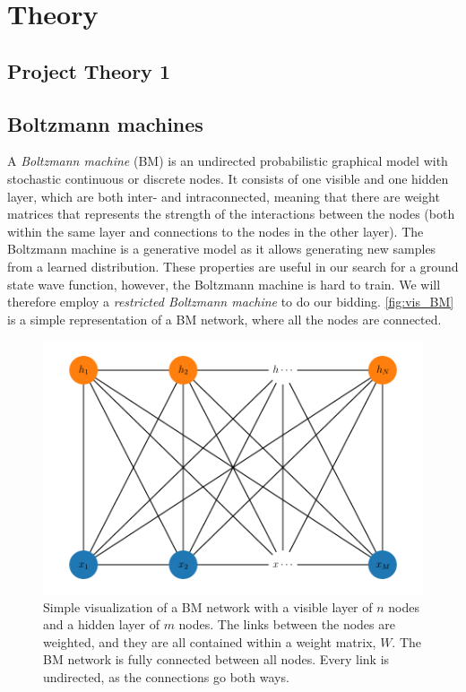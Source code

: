 \section{Theory}\label{sec:Theory}

\subsection{Project Theory 1}\label{sec:project theory}

\subsection{Boltzmann machines}
A \textit{Boltzmann machine} (BM) is an undirected probabilistic graphical model with stochastic continuous or discrete nodes. It consists of one visible and one hidden layer, which are both inter- and intraconnected, meaning that there are weight matrices that represents the strength of the interactions between the nodes (both within the same layer and connections to the nodes in the other layer). The Boltzmann machine is a generative model as it allows generating new samples from a learned distribution. These properties are useful in our search for a ground state wave function, however, the Boltzmann machine is hard to train. We will therefore employ a \textit{restricted Boltzmann machine} to do our bidding.  \autoref{fig:vis_BM} is a simple representation of a BM network, where all the nodes are connected. 

\begin{figure}[H]
\begin{center}\includegraphics[scale=0.5]{latex/latex-report/Images/bm_visualize.pdf}
\end{center}
\caption{Simple visualization of a BM network with a visible layer of $n$ nodes and a hidden layer of $m$ nodes. The links between the nodes are weighted, and they are all contained within a weight matrix, $W$. The BM network is fully connected between all nodes. Every link is undirected, as the connections go both ways.}
\label{fig:vis_BM}
\end{figure}

